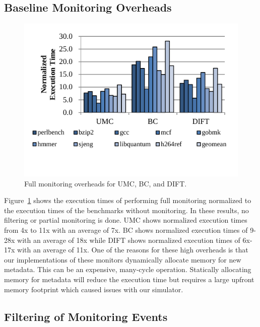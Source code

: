 \subsection{Baseline Monitoring Overheads}
\begin{figure}
  \begin{center}
    \includegraphics[width=\columnwidth]{figs/data_full_mon.pdf}
    \vspace{-0.2in}
    \caption{Full monitoring overheads for UMC, BC, and DIFT.}
    \label{fig:evaluation.full_mon}
    \vspace{-0.1in}
  \end{center}
\end{figure} Figure~\ref{fig:evaluation.full_mon} shows the execution times of
performing full monitoring normalized to the execution times of the benchmarks
without monitoring. In these results, no filtering or partial monitoring is
done. UMC shows normalized execution times from 4x to 11x with an average
of 7x. BC shows normalized execution times of 9-28x with an average of
18x while DIFT shows normalized execution times of 6x-17x with an average of
11x. One of the reasons for these high overheads is that our implementations of
these monitors dynamically allocate memory for new metadata. This can be an
expensive, many-cycle operation. Statically allocating memory for metadata
will reduce the execution time but requires a large upfront memory footprint
which caused issues with our simulator.

\subsection{Filtering of Monitoring Events}

